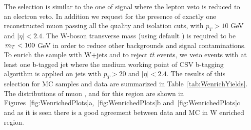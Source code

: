 The selection is similar to the one of signal where the lepton veto is reduced to an electron veto. In addition we request for the presence of exactly one reconstructed muon passing all the quality and isolation cuts, with $p_T >10$ GeV and $|\eta| <2.4$. The W-boson transverse mass (using default \met) is required to be $\,{m_T} < 100$ GeV in order to reduce other backgrounds and signal contaminations. To enrich the sample with W+jets and to reject $t\bar{t}$ events, we veto events with at least one b-tagged jet where the medium working point of CSV b-tagging algorithm is applied on jets with $p_T >20$ and $|\eta| <2.4$. The results of this selection for MC samples and data are summarized in Table~\ref{tab:WenrichYields}. The distributions of muon \pT, \mttwo and \mt for this region are shown in Figures~\ref{fig:WenrichedPlots}a,~\ref{fig:WenrichedPlots}b and~\ref{fig:WenrichedPlots}c and as it is seen there is a good agreement between data and MC in W enriched region.\\
